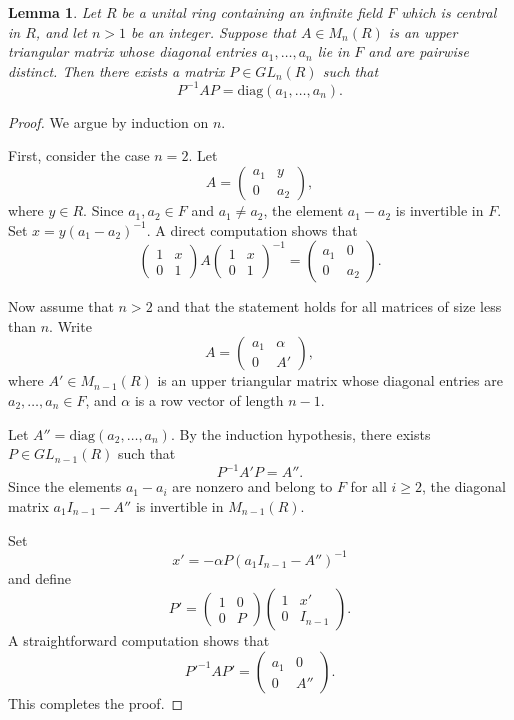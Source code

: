 \documentclass[10pt,a4paper]{amsart}
\newtheorem{lemma}[theorem]{Lemma}
\begin{document}
\begin{lemma}\label{BiSo}
	Let $R$ be a unital ring containing an infinite field $F$ which is central in $R$, and let $n>1$ be an integer.
	Suppose that $A\in M_n(R)$ is an upper triangular matrix whose diagonal entries
	$a_1,\ldots,a_n$ lie in $F$ and are pairwise distinct.
	Then there exists a matrix $P\in GL_n(R)$ such that
	\[
	P^{-1}AP=\mathrm{diag}(a_1,\ldots,a_n).
	\]
\end{lemma}

\begin{proof}
	We argue by induction on $n$.
	
	First, consider the case $n=2$. Let
	\[
	A=\begin{pmatrix}
		a_1 & y\\
		0 & a_2
	\end{pmatrix},
	\]
	where $y\in R$.
	Since $a_1,a_2\in F$ and $a_1\neq a_2$, the element $a_1-a_2$ is invertible in $F$.
	Set $x=y(a_1-a_2)^{-1}$.
	A direct computation shows that
	\[
	\begin{pmatrix}
		1 & x\\
		0 & 1
	\end{pmatrix}
	A
	\begin{pmatrix}
		1 & x\\
		0 & 1
	\end{pmatrix}^{-1}
	=
	\begin{pmatrix}
		a_1 & 0\\
		0 & a_2
	\end{pmatrix}.
	\]
	
	Now assume that $n>2$ and that the statement holds for all matrices of size less than $n$.
	Write
	\[
	A=\begin{pmatrix}
		a_1 & \alpha\\
		0 & A'
	\end{pmatrix},
	\]
	where $A'\in M_{n-1}(R)$ is an upper triangular matrix whose diagonal entries
	are $a_2,\ldots,a_n\in F$, and $\alpha$ is a row vector of length $n-1$.
	
	Let $A''=\mathrm{diag}(a_2,\ldots,a_n)$.
	By the induction hypothesis, there exists $P\in GL_{n-1}(R)$ such that
	\[
	P^{-1}A'P=A''.
	\]
	Since the elements $a_1-a_i$ are nonzero and belong to $F$ for all $i\ge2$,
	the diagonal matrix $a_1 I_{n-1}-A''$ is invertible in $M_{n-1}(R)$.
	
	Set
	\[
	x'=-\alpha P (a_1 I_{n-1}-A'')^{-1}
	\]
	and define
	\[
	P'=
	\begin{pmatrix}
		1 & 0\\
		0 & P
	\end{pmatrix}
	\begin{pmatrix}
		1 & x'\\
		0 & I_{n-1}
	\end{pmatrix}.
	\]
	A straightforward computation shows that
	\[
	P'^{-1}AP'=
	\begin{pmatrix}
		a_1 & 0\\
		0 & A''
	\end{pmatrix}.
	\]
	This completes the proof.
\end{proof}
\end{document}
